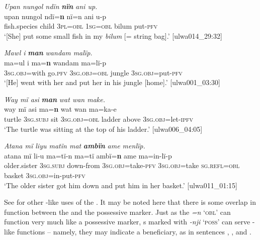 \ea%
    \label{ex:phrase:17}
          \textit{Upan nungol ndïn} \textbf{\textit{nïn}} \textit{ani up.}\\
\gll    upan  nungol  ndï=\textbf{n}    nï=n    ani    u-p\\
    fish.species  child  3\textsc{pl=obl}  1\textsc{sg=obl}  bilum  put-\textsc{pfv}\\
\glt `[She] put some small fish in my \textit{bilum} [= string bag].’ [ulwa014\_29:32]
\z

\ea%
    \label{ex:phrase:18}
          \textit{Mawl i} \textbf{\textit{man}} \textit{wandam malïp.}\\
\gll    ma=ul      i    ma=\textbf{n}    wandam  ma=lï-p\\
    3\textsc{sg.obj}=with  go.\textsc{pfv}  3\textsc{sg.obj=obl}  jungle  3\textsc{sg.obj}=put-\textsc{pfv}\\
\glt `[He] went with her and put her in his jungle [home].’ [ulwa001\_03:30]
\z

\ea%
    \label{ex:phrase:19}
          \textit{Way mï asi} \textbf{\textit{man}} \textit{wat wan make.}\\
\gll    way  mï      asi  ma=\textbf{n}      wat    wan  ma=ka-e\\
    turtle  \textsc{3sg.subj}  sit  3\textsc{sg.obj=obl}  ladder  above  3\textsc{sg.obj}=let\textsc{{}-ipfv}\\
\glt `The turtle was sitting at the top of his ladder.’ [ulwa006\_04:05]
\z

\ea%
    \label{ex:phrase:20}
          \textit{Atana mï liyu matïn mat} \textbf{\textit{ambïn}} \textit{ame menlïp.}\\
\gll    atana    mï      li-u        ma=tï-n ma=tï      ambï=\textbf{n}    ame    ma=in-lï-p\\
    older.sister  3\textsc{sg.subj}  down-from  3\textsc{sg.obj}=take-\textsc{pfv}    3\textsc{sg.obj=}take  \textsc{sg.refl=obl}  basket  3\textsc{sg.obj}=in-put-\textsc{pfv}\\
\glt `The older sister got him down and put him in her basket.’ [ulwa011\_01:15]
\z

See  for other -like uses of the . It may be noted here that there is some overlap in function between the  and the possessive marker. Just as the  \textit{=n} \textsc{‘obl'} can function very much like a possessive marker, s marked with \textit{-nji} \textsc{‘poss'} can serve -like functions -- namely, they may indicate a beneficiary, as in sentences , , and .

